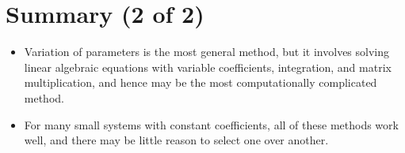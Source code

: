 \documentclass[11pt,a4paper]{article}
\begin{document}
	\section*{Summary (2 of 2)}
	\begin{itemize}
		\item Variation of parameters is the most general method, but it involves solving linear algebraic equations with variable coefficients, integration, and matrix multiplication, and hence may be the most computationally complicated method.
		\item For many small systems with constant coefficients, all of these methods work well, and there may be little reason to select one over another.
	\end{itemize}
\end{document}
